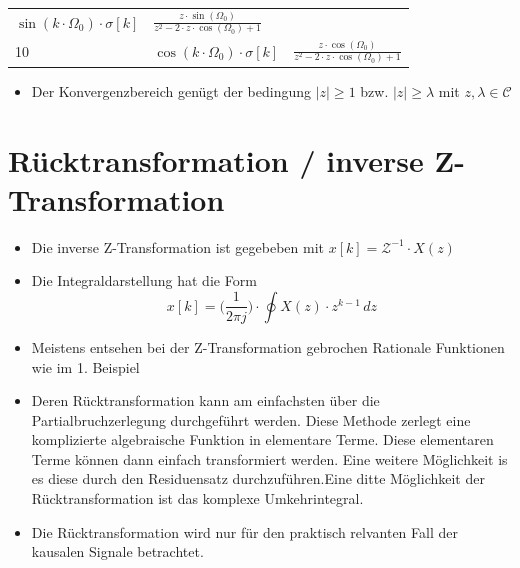 \documentclass[11pt]{article}
\providecommand{\tightlist}{%
      \setlength{\itemsep}{0pt}\setlength{\parskip}{0pt}}
\begin{document}
\begin{longtable}[]{@{}lll@{}}
\begin{minipage}[t]{0.28\columnwidth}
\(\sin (k\cdot\Omega_0)\cdot\sigma[k]\)\strut
\end{minipage} & \begin{minipage}[t]{0.58\columnwidth}\raggedright\strut
\(\frac{z\cdot\sin(\Omega_0)}{z^2-2\cdot z\cdot\cos(\Omega_0)+1}\)\strut
\end{minipage}\tabularnewline
\begin{minipage}[t]{0.05\columnwidth}\raggedright\strut
10\strut
\end{minipage} & \begin{minipage}[t]{0.28\columnwidth}\raggedright\strut
\(\cos (k\cdot\Omega_0)\cdot\sigma[k]\)\strut
\end{minipage} & \begin{minipage}[t]{0.58\columnwidth}\raggedright\strut
\(\frac{z\cdot\cos(\Omega_0)}{z^2-2\cdot z\cdot\cos(\Omega_0)+1}\)\strut
\end{minipage}\tabularnewline
\bottomrule
\end{longtable}

    \begin{itemize}
\tightlist
\item
  Der Konvergenzbereich genügt der bedingung \(|z| \geq 1\) bzw.
  \(|z| \geq \lambda\) mit \(z, \lambda\in \mathcal{C}\)
\end{itemize}

    \section{Rücktransformation / inverse
Z-Transformation}\label{ruxfccktransformation-inverse-z-transformation}

\begin{itemize}
\tightlist
\item
  Die inverse Z-Transformation ist gegebeben mit
  \(x[k] = \mathcal{Z}^{-1} \cdot X(z)\)
\end{itemize}

    \begin{itemize}
\tightlist
\item
  Die Integraldarstellung hat die Form
  \[x[k] = \big( \frac{1}{2\pi j} \big) \cdot \oint X(z) \cdot z^{k-1}\,dz\]
\end{itemize}

    \begin{itemize}
\item
  Meistens entsehen bei der Z-Transformation gebrochen Rationale
  Funktionen wie im 1. Beispiel
\item
  Deren Rücktransformation kann am einfachsten über die
  Partialbruchzerlegung durchgeführt werden. Diese Methode zerlegt eine
  komplizierte algebraische Funktion in elementare Terme. Diese
  elementaren Terme können dann einfach transformiert werden. Eine
  weitere Möglichkeit is es diese durch den Residuensatz
  durchzuführen.Eine ditte Möglichkeit der Rücktransformation ist das
  komplexe Umkehrintegral.
\item
  Die Rücktransformation wird nur für den praktisch relvanten Fall der
  kausalen Signale betrachtet.
\end{itemize}
\end{document}
